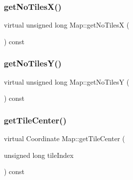 \mbox{\label{class_map_aace69b7294f0da0e2ca000dfa2a29606}} 
\subsubsection{\texorpdfstring{get\+No\+Tiles\+X()}{getNoTilesX()}}
{\footnotesize\ttfamily virtual unsigned long Map\+::get\+No\+TilesX (\begin{DoxyParamCaption}{ }\end{DoxyParamCaption}) const\hspace{0.3cm}{\ttfamily [virtual]}}

\mbox{\label{class_map_a13ff108a9b56c432665d36ba1cbad1d0}} 
\subsubsection{\texorpdfstring{get\+No\+Tiles\+Y()}{getNoTilesY()}}
{\footnotesize\ttfamily virtual unsigned long Map\+::get\+No\+TilesY (\begin{DoxyParamCaption}{ }\end{DoxyParamCaption}) const\hspace{0.3cm}{\ttfamily [virtual]}}

\mbox{\label{class_map_a3ade598881798896b554f2ba34d8b499}} 
\subsubsection{\texorpdfstring{get\+Tile\+Center()}{getTileCenter()}}
{\footnotesize\ttfamily virtual Coordinate Map\+::get\+Tile\+Center (\begin{DoxyParamCaption}\item[{unsigned long}]{tile\+Index }\end{DoxyParamCaption}) const\hspace{0.3cm}{\ttfamily [virtual]}}

\mbox{\label{class_map_a6ff5cb95191b3a749f9a14b72eba2584}} 
